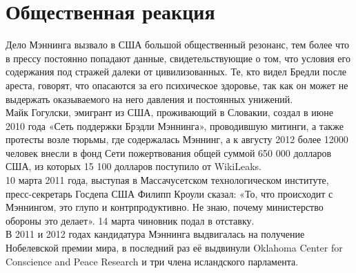 ﻿\section{Общественная реакция}
Дело Мэннинга вызвало в США большой общественный резонанс, тем более что в прессу постоянно попадают данные, свидетельствующие о том, что условия его содержания под стражей далеки от цивилизованных. Те, кто видел Бредли после ареста, говорят, что опасаются за его психическое здоровье, так как он может не выдержать оказываемого на него давления и постоянных унижений. \\
Майк Гогулски, эмигрант из США, проживающий в Словакии, создал в июне 2010 года «Сеть поддержки Брэдли Мэннинга», проводившую митинги, а также протесты возле тюрьмы, где содержалась Мэннинг, а к августу 2012 более 12000 человек внесли в фонд Сети пожертвования общей суммой 650 000 долларов США, из которых 15 100 долларов поступило от WikiLeaks. \\
10 марта 2011 года, выступая в Массачусетском технологическом институте, пресс-секретарь Госдепа США Филипп Кроули сказал: «То, что происходит с Мэннингом, это глупо и контрпродуктивно. Не знаю, почему министерство обороны это делает». 14 марта чиновник подал в отставку. \\
В 2011 и 2012 годах кандидатура Мэннинга выдвигалась на получение Нобелевской премии мира, в последний раз её выдвинули Oklahoma Center for Conscience and Peace Research и три члена исландского парламента. \cite{Manning}